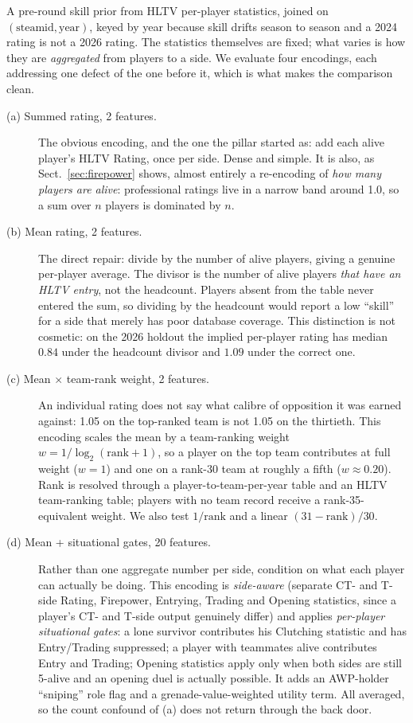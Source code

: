 \documentclass[11pt,a4paper]{article}
\begin{document}
A pre-round skill prior from HLTV per-player statistics, joined on
$(\text{steamid}, \text{year})$, keyed by year because skill drifts season to season
and a 2024 rating is not a 2026 rating. The statistics themselves are fixed; what varies
is how they are \emph{aggregated} from players to a side. We evaluate four encodings,
each addressing one defect of the one before it, which is what makes the comparison clean.

\begin{description}
  \item[(a) Summed rating, 2 features.] The obvious encoding, and the one the pillar
    started as: add each alive player's HLTV Rating, once per side. Dense and simple.
    It is also, as Sect.~\ref{sec:firepower} shows, almost entirely a re-encoding of
    \emph{how many players are alive}: professional ratings live in a narrow band around
    1.0, so a sum over $n$ players is dominated by $n$.

  \item[(b) Mean rating, 2 features.] The direct repair: divide by the number of alive
    players, giving a genuine per-player average. The divisor is the number of alive
    players \emph{that have an HLTV entry}, not the headcount. Players absent from the
    table never entered the sum, so dividing by the headcount would report a low ``skill''
    for a side that merely has poor database coverage. This distinction is not cosmetic:
    on the 2026 holdout the implied per-player rating has median $0.84$ under the headcount
    divisor and $1.09$ under the correct one.

  \item[(c) Mean $\times$ team-rank weight, 2 features.] An individual rating does not say
    what calibre of opposition it was earned against: 1.05 on the top-ranked team is not
    1.05 on the thirtieth. This encoding scales the mean by a team-ranking weight
    $w = 1/\log_2(\text{rank}+1)$, so a player on the top team contributes at full weight
    ($w=1$) and one on a rank-30 team at roughly a fifth ($w \approx 0.20$). Rank is
    resolved through a player-to-team-per-year table and an HLTV team-ranking table;
    players with no team record receive a rank-35-equivalent weight. We also test
    $1/\text{rank}$ and a linear $(31-\text{rank})/30$.

  \item[(d) Mean + situational gates, 20 features.] Rather than one aggregate number per
    side, condition on what each player can actually be doing. This encoding is
    \emph{side-aware} (separate CT- and T-side Rating, Firepower, Entrying, Trading and
    Opening statistics, since a player's CT- and T-side output genuinely differ) and
    applies \emph{per-player situational gates}: a lone survivor contributes his Clutching
    statistic and has Entry/Trading suppressed; a player with teammates alive contributes
    Entry and Trading; Opening statistics apply only when both sides are still 5-alive and
    an opening duel is actually possible. It adds an AWP-holder ``sniping'' role flag and a
    grenade-value-weighted utility term. All averaged, so the count confound of (a) does
    not return through the back door.
\end{description}
\end{document}
